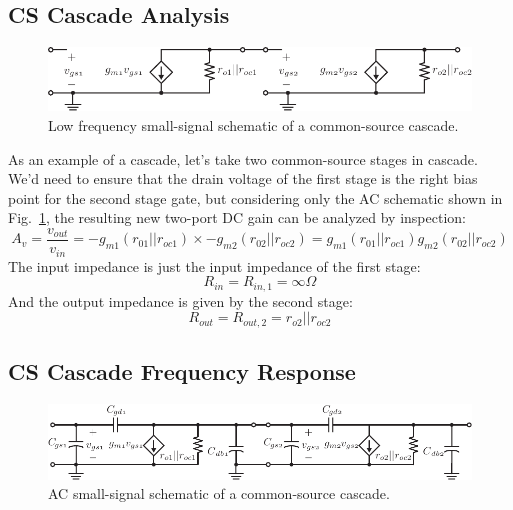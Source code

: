  



\subsection{CS Cascade Analysis}


\begin{figure}[tb]
\begin{center}
\includegraphics[scale=1]{2cs_casc_ss}
\end{center}
\caption{Low frequency small-signal schematic of a common-source cascade.} \label{fig:2cs_casc_ss}
\end{figure}

As an example of a cascade, let's take two common-source stages in cascade.  We'd need to ensure that the drain voltage of the first stage is the right bias point for the second stage gate, but considering only the AC schematic shown in Fig.~\ref{fig:2cs_casc_ss}, the resulting new two-port DC gain can be analyzed by inspection:
%
\begin{equation}
	A_v = \frac{v_{out}}{v_{in}} = -g_{m1} (r_{01}||r_{oc1}) \times  -g_{m2} (r_{02}||r_{oc2})
		= g_{m1} (r_{01}||r_{oc1}) g_{m2} (r_{02}||r_{oc2})
\end{equation}
%
The input impedance is just the input impedance of the first stage:
%
\begin{equation}
	R_{in} = R_{in,1} = \infty\Omega 
\end{equation} 
%
And the output impedance is given by the second stage:
%
\begin{equation}
	R_{out} = R_{out,2} = r_{o2} || r_{oc2} 
\end{equation}

 



\subsection{CS Cascade Frequency Response}


\begin{figure}[tb]
\begin{center}
\includegraphics[scale=1]{3cs_casc_ss_cap}
\end{center}
\caption{AC small-signal schematic of a common-source cascade.} \label{fig:3cs_casc_ss_cap}
\end{figure}

